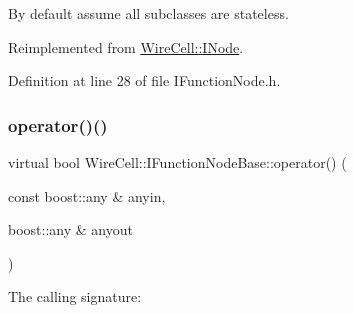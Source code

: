 By default assume all subclasses are stateless. 



Reimplemented from \hyperlink{class_wire_cell_1_1_i_node_a87d2b7293da4f6955e389ac6a2011306}{Wire\+Cell\+::\+I\+Node}.



Definition at line 28 of file I\+Function\+Node.\+h.

\mbox{\label{class_wire_cell_1_1_i_function_node_base_a8928d96f5d2030a52a490cf1d71c096f}} 
\subsubsection{\texorpdfstring{operator()()}{operator()()}}
{\footnotesize\ttfamily virtual bool Wire\+Cell\+::\+I\+Function\+Node\+Base\+::operator() (\begin{DoxyParamCaption}\item[{const boost\+::any \&}]{anyin,  }\item[{boost\+::any \&}]{anyout }\end{DoxyParamCaption})\hspace{0.3cm}{\ttfamily [pure virtual]}}



The calling signature\+: 



